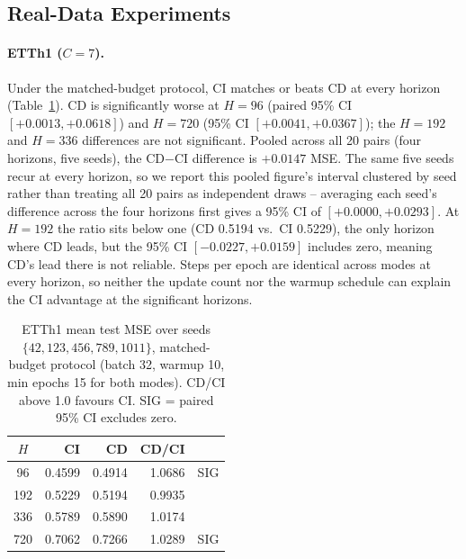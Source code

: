 \documentclass[10pt]{article} %
\begin{document}
    \subsection{Real-Data Experiments}

    \paragraph{ETTh1 ($C = 7$).} Under the matched-budget protocol, CI matches or beats CD at every horizon
    (Table~\ref{tab:etth1}). CD is significantly worse at $H = 96$ (paired 95\% CI $[+0.0013, +0.0618]$) and $H = 720$
    (95\% CI $[+0.0041, +0.0367]$); the $H = 192$ and $H = 336$ differences are not significant. Pooled across all 20 pairs
    (four horizons, five seeds), the CD$-$CI difference is $+0.0147$ MSE. The same five seeds recur at every horizon, so
    we report this pooled figure's interval clustered by seed rather than treating all 20 pairs as independent draws --
    averaging each seed's difference across the four horizons first gives a 95\% CI of $[+0.0000, +0.0293]$. At $H = 192$
    the ratio sits below one (CD 0.5194 vs.\ CI 0.5229), the only horizon where CD leads, but the 95\% CI $[-0.0227, +0.0159]$
    includes zero, meaning CD's lead there is not reliable. Steps per epoch are identical across modes at every horizon,
    so neither the update count nor the warmup schedule can explain the CI advantage at the significant horizons.

    \begin{table}[htbp]
        \centering
        \caption{ETTh1 mean test MSE over seeds $\{42, 123, 456, 789, 1011\}$, matched-budget protocol
            (batch 32, warmup 10, min epochs 15 for both modes). CD/CI above 1.0 favours CI.
            SIG = paired 95\% CI excludes zero.}
        \label{tab:etth1}
        \begin{tabular}{crrrc}
            \toprule
            $H$ & CI     & CD     & CD/CI  &     \\
            \midrule
            96  & 0.4599 & 0.4914 & 1.0686 & SIG \\
            192 & 0.5229 & 0.5194 & 0.9935 &     \\
            336 & 0.5789 & 0.5890 & 1.0174 &     \\
            720 & 0.7062 & 0.7266 & 1.0289 & SIG \\
            \bottomrule
        \end{tabular}
    \end{table}
\end{document}
